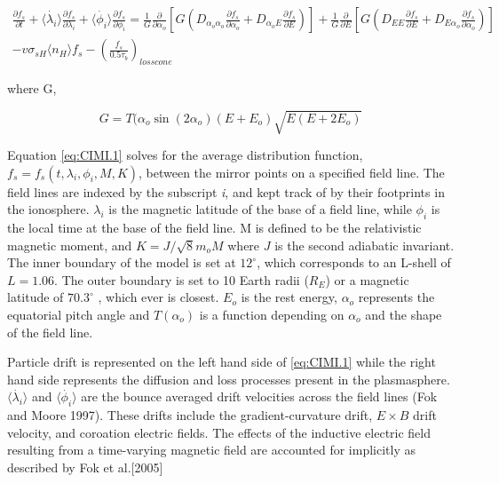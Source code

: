 \documentclass[utf8]{report}
\begin{document}
\begin{equation}
    \begin{aligned}
    \frac{\partial f_{s}}{\partial t} + \langle \dot{\lambda_{i}} \rangle \frac{\partial f_{s}}{\partial \lambda_{i}} + \langle \dot{\phi_{i}} \rangle \frac{\partial f_{s}}{\partial \phi_{i}} = \frac{1}{G} \frac{\partial}{\partial \alpha_{o}} [G(D_{\alpha_{o} \alpha_{o}}\frac{\partial f_{s}}{\partial\alpha_{o}}+D_{\alpha_{o} E}\frac{\partial f_{s}}{\partial E})]+ \frac{1}{G} \frac{\partial}{\partial E} [G(D_{EE}\frac{\partial f_{s}}{\partial E}+D_{E \alpha_{o}}\frac{\partial f_{s}}{\partial \alpha_{o}})] \\
    - v\sigma_{sH}\langle n_{H} \rangle f_{s} - (\frac{f_{s}}{0.5\tau_{b}})_{loss cone}
    \end{aligned}
    \label{eq:CIMI.1}
\end{equation}

where G, 

\begin{equation}
    G = T(\alpha_{o}\sin(2\alpha_{o})(E+E_{o})\sqrt{E(E+2E_{o})}
    \label{eq:CIMI.4}
\end{equation}

Equation \ref{eq:CIMI.1} solves for the average distribution function, $f_{s} = f_{s}(t,\lambda_{i},\phi_{i},M,K) $, between the mirror points on a specified field line. The field lines are indexed by the subscript \textit{i}, and kept track of by their footprints in the ionosphere. $\lambda_{i}$ is the magnetic latitude of the base of a field line, while $\phi_{i}$ is the local time at the base of the field line. M is defined to be the relativistic magnetic moment, and $K = J / \sqrt{8}m_{o}M$ where $J$ is the second adiabatic invariant. The inner boundary of the model is set at $12^{\circ}$, which corresponds to an L-shell of $L = 1.06$. The outer boundary is set to 10 Earth radii ($R_{E}$) or a magnetic latitude of $70.3^{\circ}$ , which ever is closest. $E_{o}$ is the rest energy, $\alpha_{o}$ represents the equatorial pitch angle and $T(\alpha_{o})$ is a function depending on $\alpha_{o}$ and the shape of the field line.

Particle drift is represented on the left hand side of \ref{eq:CIMI.1} while the right hand side represents the diffusion and loss processes present in the plasmasphere.$\langle \dot{\lambda_{i}} \rangle $ and $\langle \dot{\phi_{i}} \rangle$ are the bounce averaged drift velocities across the field lines (Fok and Moore 1997). These drifts include the gradient-curvature drift, $E \times B$ drift velocity, and coroation electric fields. The effects of the inductive electric field resulting from a time-varying magnetic field are accounted for implicitly as described by Fok et al.[2005] 
\end{document}
